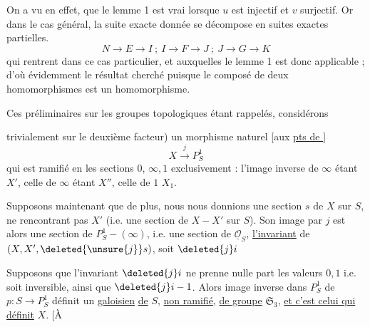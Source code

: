 On a vu en effet, que le lemme 1 est vrai lorsque $u$ est injectif et $v$ surjectif. Or dans le cas général, la suite exacte donnée se décompose en suites exactes partielles.
\[
N\longrightarrow E\longrightarrow I\ ;\ I\longrightarrow F\longrightarrow J\ ;\ J\longrightarrow G\longrightarrow K
\]
qui rentrent dans ce cas particulier, et auxquelles le lemme 1 est donc applicable ; d'où évidemment le résultat cherché puisque le composé de deux homomorphismes est un homomorphisme.

Ces préliminaires sur les groupes topologiques étant rappelés, considérons

trivialement sur le deuxième facteur) un morphisme naturel [aux \uline{pts de }]
\[
X\xrightarrow{j}P^1_S
\]
qui est ramifié en les sections $0$, $\infty,1$  exclusivement : l'image inverse de $\infty$ étant $X'$,  celle de $\infty$ étant $X''$, celle de $1$  $X_1$.


Supposons maintenant que de plus, nous nous donnions une section $s$ de $X$  sur $S$, ne rencontrant pas $X'$ (i.e. une section de $X-X'$ sur $S$). Son image par $j$ est alors une section de $P^1_S-(\infty)$, i.e. une section de $\underline{\mathcal O}_S$,  \uline{l'invariant} de $(X,X',\deleted{\unsure{j}}s)$, soit $\deleted{j}i$

Supposons que l'invariant $\deleted{j}i$ ne prenne nulle part les valeurs $0,1$ i.e. soit inversible, ainsi que $\deleted{j}i-1$. Alors  image inverse dans $P^1_S$ de $p:S\to P^1_S$ définit un   \uline{galoisien} \uline{de} $S$, \uline{non ramifié}, \uline{de groupe} $\mathfrak S_3$,  \uline{et c'est celui qui définit} $X$. [À 

